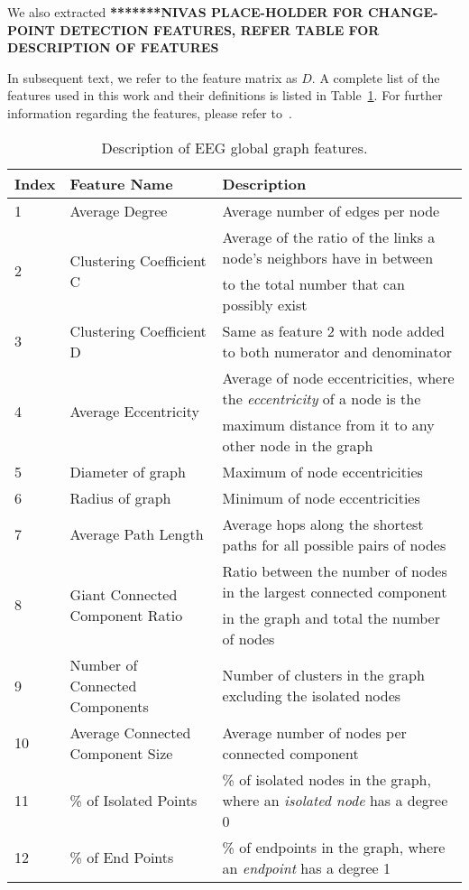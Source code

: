 \documentclass{article} %
\theoremstyle{definition}
\theoremstyle{remark}
\begin{document}
We also extracted \textbf{*******NIVAS PLACE-HOLDER FOR CHANGE-POINT DETECTION FEATURES, REFER TABLE FOR DESCRIPTION OF FEATURES}

In subsequent text, we refer to the feature matrix as $D$.  A complete list of the features used in this work and their definitions is listed in Table~\ref{tab:features}.  For further information regarding the features, please refer to~\cite{bilgin_multiscale}. 

\begin{table}[htb]
\caption{Description of EEG global graph features.}\label{tab:features}
\renewcommand{\arraystretch}{0.8} %
\begin{tabular}{lll}
Index&Feature Name& Description\\
\hline
\hline
1&Average Degree&Average number of edges per node\\
\multirow{2}{*}{2}&\multirow{2}{*}{Clustering Coefficient C} &Average of the ratio of the links a node's neighbors have in between\\
&&to the total number that can possibly exist\\
3&Clustering Coefficient D & Same as feature $2$ with node added to both numerator and denominator\\
\multirow{2}{*}{4}&\multirow{2}{*}{Average Eccentricity} & Average of node eccentricities, where the {\em eccentricity} of a node is the\\
&&maximum distance from it to any other node in the graph\\
5&Diameter of graph& Maximum of node eccentricities\\
6&Radius of graph& Minimum of node eccentricities\\
7&Average Path Length &Average hops along the shortest paths for all possible pairs of nodes\\
\multirow{2}{*}{8}&\multirow{2}{*}{Giant Connected Component Ratio}& Ratio between the number of nodes in the largest connected component\\ && in the graph and total
the number of nodes\\
9&Number of Connected Components&Number of clusters in the graph excluding the isolated nodes\\
10&Average Connected Component Size&Average number of nodes per connected component \\
11&\% of Isolated Points&\% of isolated nodes in the graph, where an {\em isolated node} has a degree 0\\
12&\% of End Points&\% of endpoints in the graph, where an {\em endpoint} has a degree 1\\

\end{tabular}
\end{table}
\end{document}
